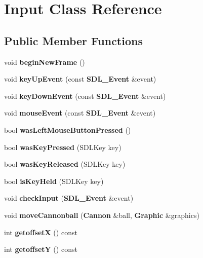 \section{Input Class Reference}
\label{class_input}
\subsection*{Public Member Functions}
\begin{DoxyCompactItemize}
\item 
void {\bfseries begin\+New\+Frame} ()\label{class_input_ac82c7c0bdc0b672b8d1354303ad09235}

\item 
void {\bfseries key\+Up\+Event} (const {\bf S\+D\+L\+\_\+\+Event} \&event)\label{class_input_af7975123c8e7bf107d3ffeb7e8c7ac62}

\item 
void {\bfseries key\+Down\+Event} (const {\bf S\+D\+L\+\_\+\+Event} \&event)\label{class_input_a2bcc16ac90c1001921978e6a2c470242}

\item 
void {\bfseries mouse\+Event} (const {\bf S\+D\+L\+\_\+\+Event} \&event)\label{class_input_a33758e5fc972c30d2effca8c45af2a3d}

\item 
bool {\bfseries was\+Left\+Mouse\+Button\+Pressed} ()\label{class_input_a0dad9a60338030fae228726f7d76bfe1}

\item 
bool {\bfseries was\+Key\+Pressed} (S\+D\+L\+Key key)\label{class_input_a20a05eafeefe8f0a4a901d8c23c862e6}

\item 
bool {\bfseries was\+Key\+Released} (S\+D\+L\+Key key)\label{class_input_a40f4e0bef7deaf1b81c517c8d2e4e08c}

\item 
bool {\bfseries is\+Key\+Held} (S\+D\+L\+Key key)\label{class_input_af69e24c9d691c43f56a4afc20d56a081}

\item 
void {\bfseries check\+Input} ({\bf S\+D\+L\+\_\+\+Event} \&event)\label{class_input_a6ea35796697b6be39118d7d51e8a47a5}

\item 
void {\bfseries move\+Cannonball} ({\bf Cannon} \&ball, {\bf Graphic} \&graphics)\label{class_input_a021cb5427da09e513b4ac4ed60f7b178}

\item 
int {\bfseries getoffset\+X} () const \label{class_input_a3f79c2144849f550f9102856d46d3d59}

\item 
int {\bfseries getoffset\+Y} () const \label{class_input_a76e210586ca26895c80af7268475187f}

\end{DoxyCompactItemize}


